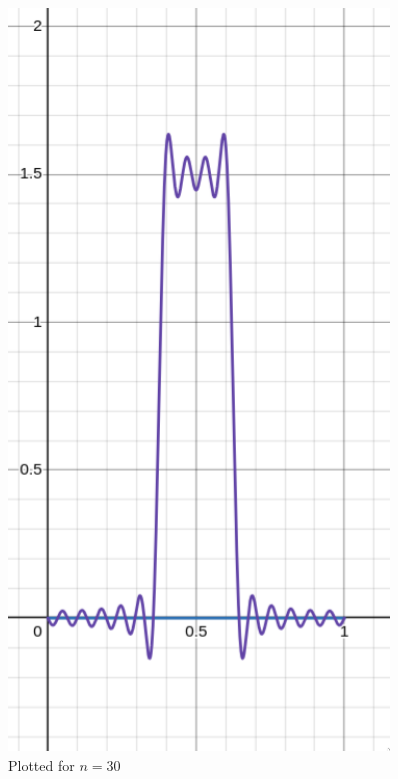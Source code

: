 \documentclass[letter]{article}
\begin{document}
\begin{minipage}{0.3\textwidth}
	\begin{figure}[H]
		\centering
		\includegraphics[width=0.9\textwidth]{ss/speed03.png}
		\caption{Plotted for $n = 30$}
		\label{fig:ss-speed03-png}
	\end{figure}
\end{minipage}
\end{document}

